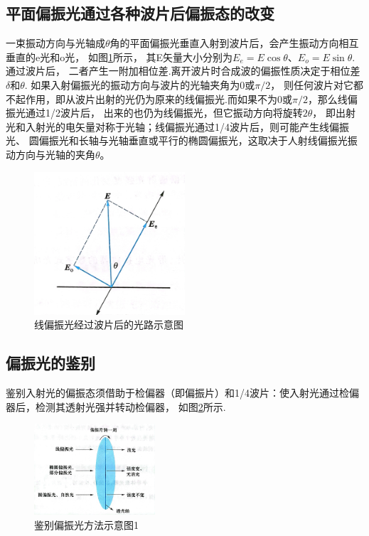 \documentclass{ctexart}
\begin{document}
  \subsection{平面偏振光通过各种波片后偏振态的改变}
  一束振动方向与光轴成$\theta$角的平面偏振光垂直入射到波片后，会产生振动方向相互垂直的e光和o光，
  如图\ref{bojingpianguanglu}所示，
  其E矢量大小分别为$E_{e} = E \cos \theta$、$E_{o}=E\sin\theta$.通过波片后，
  二者产生一附加相位差.离开波片时合成波的偏振性质决定于相位差$\delta$和$\theta$.
  如果入射偏振光的振动方向与波片的光轴夹角为0或$\pi/2$，
  则任何波片对它都不起作用，即从波片出射的光仍为原来的线偏振光.而如果不为0或$\pi/2$，那么线偏振光通过1/2波片后，
  出来的也仍为线偏振光，但它振动方向将旋转$2\theta$，
  即出射光和入射光的电矢量对称于光轴；线偏振光通过1/4波片后，则可能产生线偏振光、
  圆偏振光和长轴与光轴垂直或平行的椭圆偏振光，这取决于人射线偏振光振动方向与光轴的夹角$\theta$。

  \begin{figure}[H]\label{bojingpianguanglu}
    \centering
    \includegraphics[width=0.5\textwidth,height=0.3\textheight]{bojingpianguanglu.jpg}
    \caption{线偏振光经过波片后的光路示意图}
  \end{figure}

  \subsection{偏振光的鉴别}
  鉴别入射光的偏振态须借助于检偏器（即偏振片）和1/4波片：使入射光通过检偏器后，检测其透射光强并转动检偏器，
  如图\ref{jianbiefangfa}所示.

  \begin{figure}[H]\label{jianbiefangfa}
    \centering
    \includegraphics[width=0.4\textwidth,height=0.3\textheight]{jianbiefangfa.jpg}
    \caption{鉴别偏振光方法示意图1}
  \end{figure}
\end{document}
